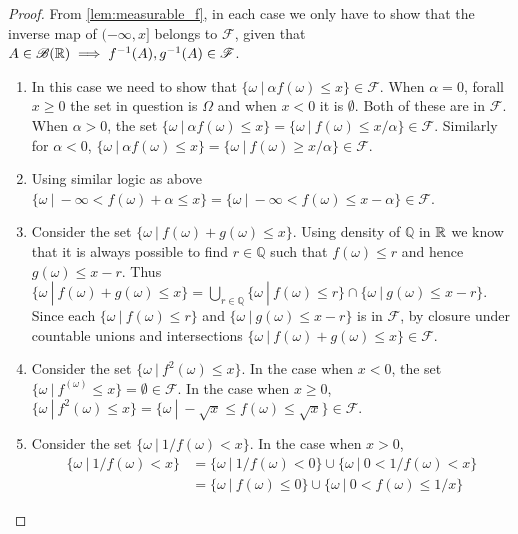 \begin{proof}
  From \cref{lem:measurable_f}, in each case we only have to show that the inverse map of $(-\infty,x]$ belongs to $ \mathscr{F}$, given that $A\in \mathscr{B}( \mathbb{R})\implies f^{-1}(A),g^{-1}(A)\in \mathscr{F}$. 
  \begin{enumerate}
    \item In this case we need to show that $\{\omega\ |\ \alpha f(\omega)\leq x\}\in \mathscr{F}$. When $\alpha = 0$, forall $x\geq 0$ the set in question is $\Omega$ and when $x<0$ it is $\emptyset$. Both of these are in $ \mathscr{F}$. When $\alpha>0$, the set $\{\omega\ |\ \alpha f(\omega) \leq x\} = \{\omega\ |\ f(\omega)\leq x/\alpha\} \in \mathscr{F}$. Similarly for $\alpha < 0$, $\{\omega\ |\ \alpha f(\omega)\leq x\} = \{\omega\ |\ f(\omega)\geq x/\alpha\}\in \mathscr{F}$.\\
    \item Using similar logic as above $\{\omega\ |\ -\infty <f(\omega) +\alpha \leq x\} =\{\omega\ |\ -\infty <f(\omega) \leq x-\alpha \} \in \mathscr{F}$. \\
    \item Consider the set $\{\omega\ |\ f(\omega)+g(\omega) \leq x\}$. Using density of $ \mathbb{Q}$ in $\mathbb{R}$ we know that it is always possible to find $r\in \mathbb{Q}$ such that $f(\omega)\leq r$ and hence $g(\omega)\leq x-r $. Thus $\{\omega\ |\ f(\omega)+g(\omega) \leq x\} = \bigcup_{r\in \mathbb{Q}}\{\omega\ |\ f(\omega) \leq r\}\cap \{\omega\ |\ g(\omega) \leq x-r\} $. Since each $\{\omega\ |\ f(\omega) \leq r\}$ and $\{\omega\ |\ g(\omega) \leq x-r\}$ is in $ \mathscr{F}$, by closure under countable unions and intersections $\{\omega\ |\ f(\omega)+g(\omega) \leq x\}\in \mathscr{F}$.\\
    \item Consider the set $\{\omega\ |\ f^2(\omega) \leq x\}$. In the case when $x<0$, the set $\{\omega\ |\ f^(\omega) \leq x\} = \emptyset\in \mathscr{F}$. In the case when $x\geq0$, $\{\omega\ |\ f^2(\omega) \leq x\} = \{\omega\ |\ -\sqrt{x} \leq f(\omega) \leq \sqrt{x}\}\in \mathscr{F}.$\\   
    \item Consider the set $\{\omega\ |\ 1/f(\omega) < x\}$. In the case when $x>0$, 
      \begin{align*}
        \{\omega\ |\ 1/f(\omega) < x\} &= \{\omega\ |\ 1/f(\omega) < 0\}\cup \{\omega\ |\ 0<1/f(\omega) < x\}\\ &= \{\omega\ |\ f(\omega) \leq 0\}\cup \{\omega\ |\ 0<f(\omega) \leq 1/x\}

\end{align*}
\end{enumerate}
\end{proof}
